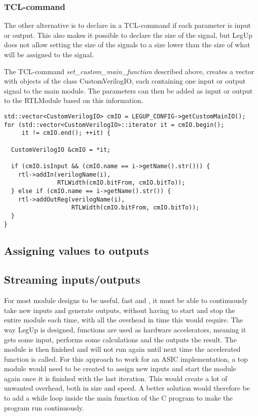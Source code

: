 \subsubsection{TCL-command}
The other alternative is to declare in a TCL-command if each parameter is input or output. This also makes it possible to declare the size of the signal, but LegUp does not allow setting the size of the signals to a size lower than the size of what will be assigned to the signal.

The TCL-command \textit{set\_custom\_main\_function} described above, creates a vector with objects of the class CustomVerilogIO, each containing one input or output signal to the main module. The parameters can then be added as input or output to the RTLModule based on this information.
\begin{lstlisting}
std::vector<CustomVerilogIO> cmIO = LEGUP_CONFIG->getCustomMainIO();
for (std::vector<CustomVerilogIO>::iterator it = cmIO.begin();
     it != cmIO.end(); ++it) {

  CustomVerilogIO &cmIO = *it;

  if (cmIO.isInput && (cmIO.name == i->getName().str())) {
    rtl->addIn(verilogName(i),
               RTLWidth(cmIO.bitFrom, cmIO.bitTo));
  } else if (cmIO.name == i->getName().str()) {
    rtl->addOutReg(verilogName(i),
                   RTLWidth(cmIO.bitFrom, cmIO.bitTo));
  }
}
\end{lstlisting}

\subsection{\label{sec:assValueToOutput}Assigning values to outputs}

\subsection{Streaming inputs/outputs}
For most module designs to be useful, fast and , it must be able to continuously take new inputs and generate outputs, without having to start and stop the entire module each time, with all the overhead in time this would require. The way LegUp is designed, functions are used as hardware accelerators, meaning it gets some input, performs some calculations and the outputs the result. The module is then finished and will not run again until next time the accelerated function is called. For this approach to work for an ASIC implementation, a top module would need to be created to assign new inputs and start the module again once it is finished with the last iteration. This would create a lot of unwanted overhead, both in size and speed. A better solution would therefore be to add a while loop inside the main function of the C program to make the program run continuously.

